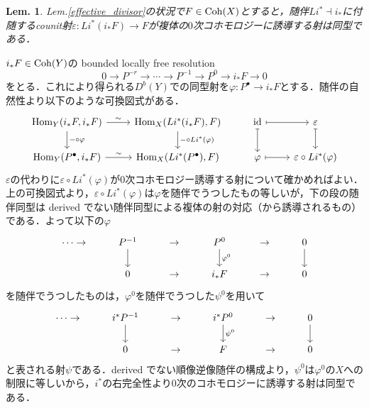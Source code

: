\documentclass[uplatex,a4paper,11pt,dvipdfmx]{jsarticle}
\makeatletter
\theoremstyle{mystyle} %
\newtheorem{lemma}{Lem.}[section]
\renewenvironment{proof}[1][\proofname]{\par
 \pushQED{\qed}%
 \normalfont \topsep6\p@\@plus6\p@\relax
 \trivlist
 \item[\hskip\labelsep
 \itshape
 {\bf\underline{#1}}]\ignorespaces
}{%
 \popQED\endtrivlist\@endpefalse
}
\DeclareMathOperator{\Hom}{Hom}
\DeclareMathOperator{\id}{id}
\makeatother
\begin{document}
\begin{comment}
\begin{lemma}
	$Y$を非特異代数多様体とし，$X \subset Y$をregular immersionとする．また$C_{X/Y}$をそのconormal sheafとする．このとき任意の$F \in \Coh(X)$について$$Li^*(i_*F) \cong \bigoplus_{k = 0}^r (F\otimes \wedge^k C_{X/Y})[k]$$となる．
\end{lemma}
\begin{proof}
	$i_* \colon D^*(X) \to D^*(Y)$はexactだから$i_*Li^* \cong L(i_*i^*)$である．ここで$i_*i^* \cong -\otimes_{\mathcal{O}_Y}\mathcal{O}_X$だから，$L(i_*i^*) \cong -\otimes^L_{\mathcal{O}_Y}\mathcal{O}_X$となる．またregular immersionの仮定より，Koszul resolution
\end{proof}
\end{comment}
\begin{lemma}\label{counit_map}
	Lem.\ref{effective_divisor}の状況で$F \in \operatorname{Coh}(X)$とすると，随伴$Li^* \dashv i_*$に付随するcounit射$\varepsilon \colon Li^*(i_*F) \to F$が複体の$0$次コホモロジーに誘導する射は同型である．
\end{lemma}
\begin{proof}
	$i_*F \in \operatorname{Coh}(Y)$の bounded locally free resolution
	$$0 \to P^{-r}\to\cdots\to P^{-1}\to P^0 \to i_* F \to 0$$
	をとる．これにより得られる$D^b(Y)$での同型射を$\varphi \colon P^\bullet \to i_*F$とする．随伴の自然性より以下のような可換図式がある．
	\[
		\begin{tikzcd}
			\Hom_Y(i_*F, i_*F) \arrow[r, "\sim"]\arrow[d, "- \circ \varphi"] & \Hom_X(Li^*(i_*F), F) \arrow[d, "- \circ Li^*(\varphi)"]&\id \arrow[r, mapsto]\arrow[d, mapsto] & \varepsilon \arrow[d, mapsto]\\
			\Hom_Y(P^\bullet, i_*F) \arrow[r, "\sim"] & \Hom_X(Li^*(P^\bullet), F)&\varphi \arrow[r, mapsto] & \varepsilon \circ Li^*(\varphi)
		\end{tikzcd}
	\]
	$\varepsilon$の代わりに$\varepsilon \circ Li^*(\varphi)$が$0$次コホモロジー誘導する射について確かめればよい．上の可換図式より，$\varepsilon \circ Li^*(\varphi)$は$\varphi$を随伴でうつしたもの等しいが，下の段の随伴同型は derived でない随伴同型による複体の射の対応（から誘導されるもの）である．よって以下の$\varphi$
	\[
		\begin{tikzcd}
			\cdots\to &P^{-1}\arrow[d]&\to &P^0 \arrow[d, "\varphi^0"] &\to &0\arrow[d]\\
			&0&\to& i_*F & \to &0
		\end{tikzcd}
	\]
	を随伴でうつしたものは，$\varphi^0$を随伴でうつした$\psi^0$を用いて
	\[
		\begin{tikzcd}
			\cdots\to &i^*P^{-1}\arrow[d]&\to &i^*P^0 \arrow[d, "\psi^0"] &\to &0\arrow[d]\\
			&0&\to& F & \to &0
		\end{tikzcd}
	\]
	と表される射$\psi$である．derived でない順像逆像随伴の構成より，$\psi^0$は$\varphi^0$の$X$への制限に等しいから，$i^*$の右完全性より$0$次のコホモロジーに誘導する射は同型である．


\end{proof}
\end{document}
